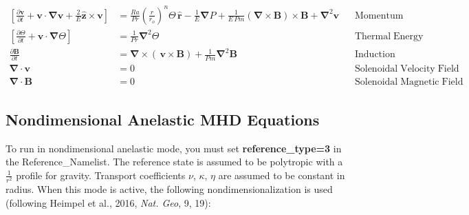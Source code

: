 \documentclass[10pt, letterpaper]{article}
\begin{document}
\begin{align*}
\left[\frac{\partial \boldsymbol{v}}{\partial t} +\boldsymbol{v}\cdot\boldsymbol{\nabla}\boldsymbol{v}  %
                                                         +\frac{2}{E}\boldsymbol{\hat{z}}\times\boldsymbol{v} \right]  &= %
                                                         \frac{Ra}{Pr}\left(\frac{r}{r_o}\right)^n\Theta\,\boldsymbol{\hat{r}} %
                                                         -\frac{1}{E}\boldsymbol{\nabla}P %
                                                         +\frac{1}{E\,Pm}\left(\boldsymbol{\nabla}\times\boldsymbol{B}\right)\times\boldsymbol{B} %
                                                         +\boldsymbol{\nabla}^2\boldsymbol{v} \;\;\; &\mathrm{Momentum}\\
%
%
\left[\frac{\partial \Theta}{\partial t} +\boldsymbol{v}\cdot\boldsymbol{\nabla}\Theta \right] &=
                                             \frac{1}{Pr}\boldsymbol{\nabla}^2\Theta  &\mathrm{Thermal\; Energy}\\ %
%
%
\frac{\partial \boldsymbol{B}}{\partial t} &= \boldsymbol{\nabla}\times\left(\,\boldsymbol{v}\times\boldsymbol{B}\right)+\frac{1}{Pm}\boldsymbol{\nabla}^2\boldsymbol{B} &\mathrm{Induction} \\
%
%
%
%
%
%
\boldsymbol{\nabla}\cdot\boldsymbol{v}&=0 &\mathrm{Solenoidal\; Velocity\; Field}\\
\boldsymbol{\nabla}\cdot\boldsymbol{B}&=0 &\mathrm{Solenoidal\; Magnetic\; Field}
\end{align*}



\subsection{Nondimensional Anelastic MHD Equations}
To run in nondimensional anelastic mode, you must set \textbf{reference\_type=3} in the Reference\_Namelist.  The reference state is assumed to be polytropic with a $\frac{1}{r^2}$ profile for gravity.  Transport coefficients $\nu$, $\kappa$, $\eta$ are assumed to be constant in radius.   When this mode is active, the following nondimensionalization is used (following Heimpel et al., 2016, \textit{Nat. Geo}, 9, 19):
\end{document}
